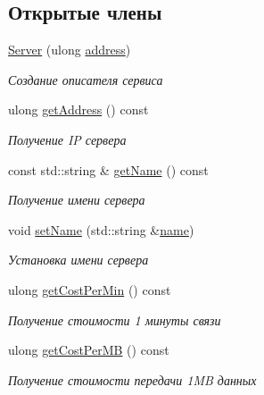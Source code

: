 \subsection*{Открытые члены}
\begin{DoxyCompactItemize}
\item 
\hyperlink{class_network_service_1_1_server_a2d34de4725c705fe2fef379eb5d40f8c}{Server} (ulong \hyperlink{class_network_service_1_1_server_a09382556ff4ab5abc7a79a333ad92329}{address})
\begin{DoxyCompactList}\small\item\em Создание описателя сервиса \end{DoxyCompactList}\item 
ulong \hyperlink{class_network_service_1_1_server_af119e62540303172462f3111784963e9}{get\+Address} () const 
\begin{DoxyCompactList}\small\item\em Получение I\+P сервера \end{DoxyCompactList}\item 
const std\+::string \& \hyperlink{class_network_service_1_1_server_a6dfb5c080e28f814316f641e56383eeb}{get\+Name} () const 
\begin{DoxyCompactList}\small\item\em Получение имени сервера \end{DoxyCompactList}\item 
void \hyperlink{class_network_service_1_1_server_a33076324ad9201dc947be14195a85ad1}{set\+Name} (std\+::string \&\hyperlink{class_network_service_1_1_server_aaab7735b4b5809169ecb92fa66f0bca7}{name})
\begin{DoxyCompactList}\small\item\em Установка имени сервера \end{DoxyCompactList}\item 
ulong \hyperlink{class_network_service_1_1_server_a08126e6a88407ffeacc860588eb6cee4}{get\+Cost\+Per\+Min} () const 
\begin{DoxyCompactList}\small\item\em Получение стоимости 1 минуты связи \end{DoxyCompactList}\item 
ulong \hyperlink{class_network_service_1_1_server_a45d1ea42776ec586c762a2b0b0e5560e}{get\+Cost\+Per\+M\+B} () const 
\begin{DoxyCompactList}\small\item\em Получение стоимости передачи 1\+M\+B данных \end{DoxyCompactList}\item 

\end{DoxyCompactItemize}
